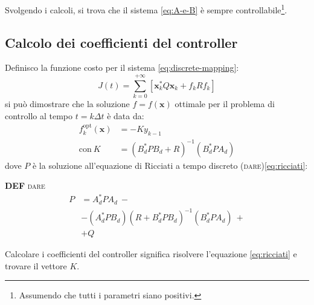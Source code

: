Svolgendo i calcoli, si trova che il sistema \eqref{eq:A-e-B} è sempre controllabile\footnote{Assumendo che tutti i
parametri siano positivi.}.

\subsection{Calcolo dei coefficienti del controller}\label{calcolo-coefficienti}
Definisco la funzione costo per il sistema \eqref{eq:discrete-mapping}:
\begin{equation}
  J(t) =
  \sum_{k=0}^{+\infty} \left[ \mathbf{x}_k^* Q \mathbf {x}_k + f_k R f_k \right]
  \label{eq:lqr-costo-discreto}
\end{equation}
si può dimostrare\cite{chow1975analysis} che la soluzione $f = f(\mathbf x)$ ottimale per il problema di controllo al tempo $t = k \Delta t$ è data da:
\begin{equation}
  \begin{aligned}
  f_k^{\text{opt}}(\mathbf x) &= -K y_{k-1} \\
  \text{con}\ K &= (B_d^*PB_d + R)^{-1}(B_d^*PA_d)
  \end{aligned}
  \label{eq:f-opt}
\end{equation}
dove $P$ è la soluzione all'equazione di Ricciati a tempo discreto (\textsc{dare})\eqref{eq:ricciati}:%
\begin{framed}
  \textbf{DEF} \textsc{dare}
  \begin{equation}
    \begin{aligned}
    P &=A_d^* P A_d\ - \\
     &-(A_d^* P B_d)(R + B_d^* P B_d)^{-1}(B_d^* P A_d)\ + \\
    &+ Q
    \end{aligned}
    \label{eq:ricciati}
  \end{equation}%
\end{framed}%
Calcolare i coefficienti del controller significa risolvere l'equazione \eqref{eq:ricciati} e trovare il vettore $K$.

